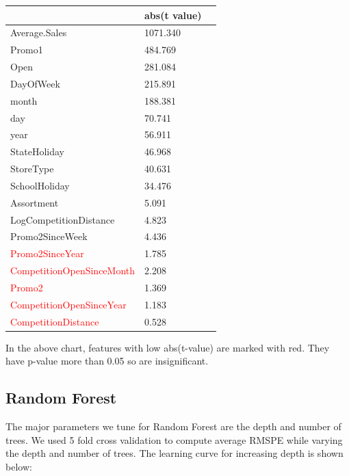 \documentclass[letterpaper,twocolumn,11pt]{article}
\begin{document}
\begin{center}
    \begin{tabular}{| l | l | l |}
      \hline
       & abs(t value) \\ \hline
      Average.Sales & 1071.340 \\ \hline
      Promo1 & 484.769 \\ \hline
      Open & 281.084 \\ \hline
      DayOfWeek & 215.891 \\ \hline
      month & 188.381 \\ \hline
      day & 70.741 \\ \hline
      year & 56.911 \\ \hline
      StateHoliday & 46.968 \\ \hline
      StoreType & 40.631 \\ \hline
      SchoolHoliday & 34.476 \\ \hline
      Assortment & 5.091 \\ \hline
      LogCompetitionDistance & 4.823 \\ \hline 
      Promo2SinceWeek & 4.436 \\ \hline
      \textcolor{red}{Promo2SinceYear} & 1.785 \\ \hline  
      \textcolor{red}{CompetitionOpenSinceMonth} & 2.208 \\ \hline
      \textcolor{red}{Promo2} & 1.369 \\ \hline
      \textcolor{red}{CompetitionOpenSinceYear} & 1.183 \\ \hline
      \textcolor{red}{CompetitionDistance} & 0.528 \\ \hline
      \hline    
    \end{tabular}
\end{center}

In the above chart, features with low abs(t-value) are marked with red. They have p-value more than 0.05 so are insignificant.

\subsection{Random Forest}
The major parameters we tune for Random Forest are the depth and number of trees. We used 5 fold cross validation to compute average RMSPE while varying the depth and number of trees. The learning curve for increasing depth is shown below:
\end{document}
